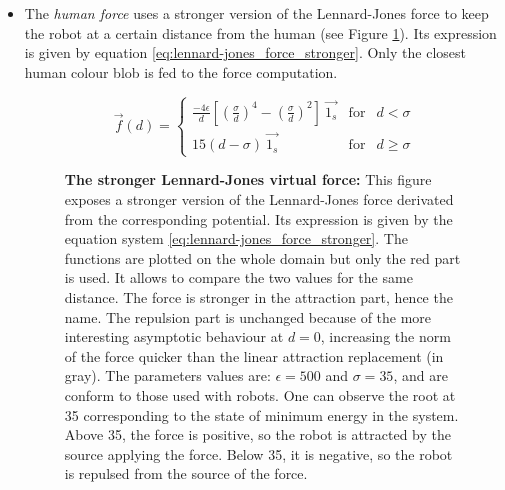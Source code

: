\documentclass[oneside, a4paper, 12pt]{memoir}
\let\oldCaption\caption
\renewcommand{\caption}[2]{
\oldCaption[#1]{{\small\sffamily\bfseries #1:} #2}
}
\begin{document}
			\begin{itemize}
				\item The \emph{human force} uses a stronger version of the Lennard-Jones force to keep the robot at a certain distance from the human (see Figure \ref{fig:lennard-jones_force_stronger}). Its expression is given by equation \ref{eq:lennard-jones_force_stronger}. Only the closest human colour blob is fed to the force computation.
				
					\begin{equation}
						\vec{f}(d) = \left\{ \begin{array}{rcl}
						\frac{-4\epsilon}{d} \left[ \left(\frac{\sigma}{d}\right)^{4} - \left(\frac{\sigma}{d}\right)^2 \right] ~\vec{1_s} & \mbox{for} & d < \sigma \\
						15(d - \sigma ) ~\vec{1_s} & \mbox{for} & d \geq \sigma
						\end{array}\right.
						\label{eq:lennard-jones_force_stronger}
					\end{equation}
				
					\begin{figure}[!htp]\centering
						
						\caption{The stronger Lennard-Jones virtual force}{This figure exposes a stronger version of the Lennard-Jones force derivated from the corresponding potential. Its expression is given by the equation system \ref{eq:lennard-jones_force_stronger}. The functions are plotted on the whole domain but only the red part is used. It allows to compare the two values for the same distance. The force is stronger in the attraction part, hence the name. The repulsion part is unchanged because of the more interesting asymptotic behaviour at $d=0$, increasing the norm of the force quicker than the linear attraction replacement (in gray). The parameters values are: $\epsilon=500$ and $\sigma=35$, and are conform to those used with robots. One can observe the root at 35 corresponding to the state of minimum energy in the system. Above 35, the force is positive, so the robot is attracted by the source applying the force. Below 35, it is negative, so the robot is repulsed from the source of the force.}
						\label{fig:lennard-jones_force_stronger}
					\end{figure}
				

\end{itemize}
\end{document}
